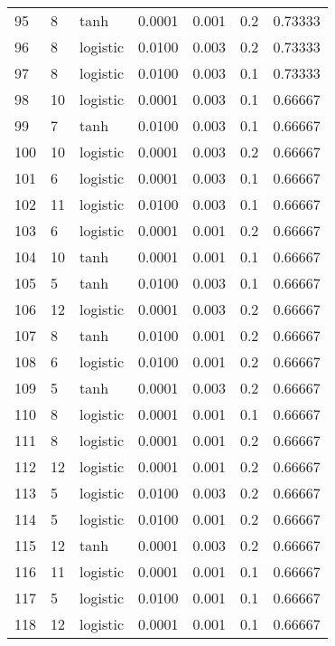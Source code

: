 \begin{tabular}{lllrrrr}
95  &           8 &      tanh &  0.0001 &  0.001 &  0.2 &   0.73333 \\
96  &           8 &  logistic &  0.0100 &  0.003 &  0.2 &   0.73333 \\
97  &           8 &  logistic &  0.0100 &  0.003 &  0.1 &   0.73333 \\
98  &          10 &  logistic &  0.0001 &  0.003 &  0.1 &   0.66667 \\
99  &           7 &      tanh &  0.0100 &  0.003 &  0.1 &   0.66667 \\
100 &          10 &  logistic &  0.0001 &  0.003 &  0.2 &   0.66667 \\
101 &           6 &  logistic &  0.0001 &  0.003 &  0.1 &   0.66667 \\
102 &          11 &  logistic &  0.0100 &  0.003 &  0.1 &   0.66667 \\
103 &           6 &  logistic &  0.0001 &  0.001 &  0.2 &   0.66667 \\
104 &          10 &      tanh &  0.0001 &  0.001 &  0.1 &   0.66667 \\
105 &           5 &      tanh &  0.0100 &  0.003 &  0.1 &   0.66667 \\
106 &          12 &  logistic &  0.0001 &  0.003 &  0.2 &   0.66667 \\
107 &           8 &      tanh &  0.0100 &  0.001 &  0.2 &   0.66667 \\
108 &           6 &  logistic &  0.0100 &  0.001 &  0.2 &   0.66667 \\
109 &           5 &      tanh &  0.0001 &  0.003 &  0.2 &   0.66667 \\
110 &           8 &  logistic &  0.0001 &  0.001 &  0.1 &   0.66667 \\
111 &           8 &  logistic &  0.0001 &  0.001 &  0.2 &   0.66667 \\
112 &          12 &  logistic &  0.0001 &  0.001 &  0.2 &   0.66667 \\
113 &           5 &  logistic &  0.0100 &  0.003 &  0.2 &   0.66667 \\
114 &           5 &  logistic &  0.0100 &  0.001 &  0.2 &   0.66667 \\
115 &          12 &      tanh &  0.0001 &  0.003 &  0.2 &   0.66667 \\
116 &          11 &  logistic &  0.0001 &  0.001 &  0.1 &   0.66667 \\
117 &           5 &  logistic &  0.0100 &  0.001 &  0.1 &   0.66667 \\
118 &          12 &  logistic &  0.0001 &  0.001 &  0.1 &   0.66667 \\

\end{tabular}
